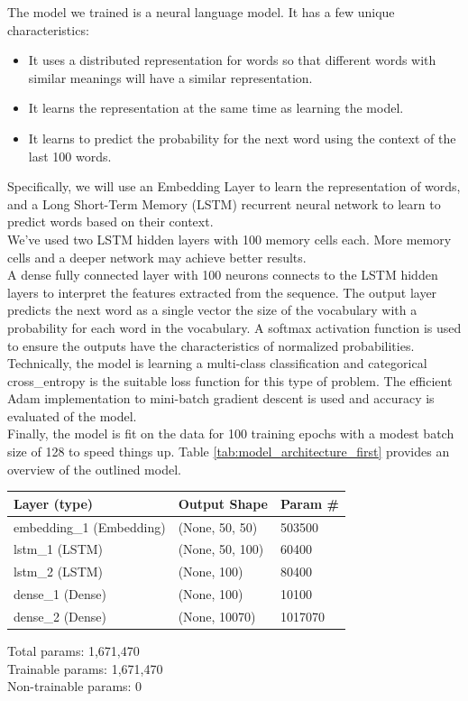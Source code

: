 \documentclass[conference]{IEEEtran}
\begin{document}
The model we trained is a neural language model. It has a few unique characteristics:

\begin{itemize}
\item It uses a distributed representation for words so that different words with similar meanings will have a similar representation.
\item It learns the representation at the same time as learning the model.
\item It learns to predict the probability for the next word using the context of the last 100 words.
\end{itemize}

Specifically, we will use an Embedding Layer to learn the representation of words, and a Long Short-Term Memory (LSTM) recurrent neural network to learn to predict words based on their context.\\
We’ve used two LSTM hidden layers with 100 memory cells each. More memory cells and a deeper network may achieve better results.\\
A dense fully connected layer with 100 neurons connects to the LSTM hidden layers to interpret the features extracted from the sequence. The output layer predicts the next word as a single vector the size of the vocabulary with a probability for each word in the vocabulary. A softmax activation function is used to ensure the outputs have the characteristics of normalized probabilities.\\
Technically, the model is learning a multi-class classification and categorical cross\_entropy is the suitable loss function for this type of problem. The efficient Adam implementation to mini-batch gradient descent is used and accuracy is evaluated of the model.\\
Finally, the model is fit on the data for 100 training epochs with a modest batch size of 128 to speed things up. Table \ref{tab:model_architecture_first} provides an overview of the outlined model.

\begin{center}
\begin{tabular}{l l l}
\hline
Layer (type) & Output Shape & Param \#\\
\hline
\hline
embedding\_1 (Embedding) & (None, 50, 50) & 503500\\
\hline
lstm\_1 (LSTM) & (None, 50, 100) & 60400\\
\hline
lstm\_2 (LSTM) & (None, 100) & 80400\\
\hline
dense\_1 (Dense) & (None, 100) & 10100\\
\hline
dense\_2 (Dense) & (None, 10070) & 1017070\\
\hline
\hline
\end{tabular}
\begin{flushleft}
Total params: 1,671,470\\
Trainable params: 1,671,470\\
Non-trainable params: 0
\end{flushleft}
\end{center}
\end{document}
